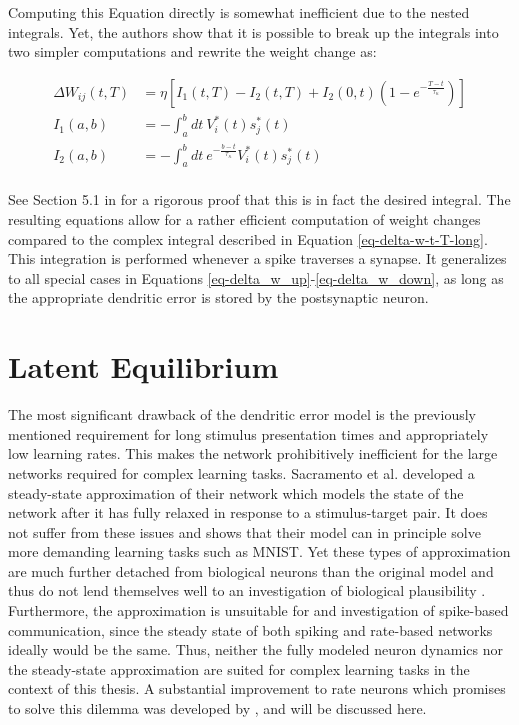 Computing this Equation directly is somewhat inefficient due to the nested integrals. Yet, the authors show that it is
possible to break up the integrals into two simpler computations and rewrite the weight change as:


\begin{align}
  \Delta W_{ij}(t, T) & = \eta \left[ I_1 (t, T) - I_2(t,T) + I_2(0,t)\left( 1- e^{-\frac{T-t}{\tau_\kappa}} \right) \right]\label{eq-proof-start} \\
  I_1(a, b)           & = -\int_{a}^{b} dt \ V_i^\ast (t) s_j^\ast (t)                                                                             \\
  I_2(a, b)           & = -\int_{a}^{b} dt \ e^{-\frac{b-t}{\tau_\kappa}} V_i^\ast (t) s_j^\ast (t)\label{eq-proof-end}                            \\
\end{align}

See Section 5.1 in \citep{Stapmanns2021} for a rigorous proof that this is in fact the desired integral. The resulting
equations allow for a rather efficient computation of weight changes compared to the complex integral described in
Equation \ref{eq-delta-w-t-T-long}. This integration is performed whenever a spike traverses a synapse. It generalizes
to all special cases in Equations \ref{eq-delta_w_up}-\ref{eq-delta_w_down}, as long as the appropriate dendritic error
is stored by the postsynaptic neuron.

\section{Latent Equilibrium}\label{sec-latent-eq}

The most significant drawback of the dendritic error model is the previously mentioned requirement for long stimulus
presentation times and appropriately low learning rates. This makes the network prohibitively inefficient for the large
networks required for complex learning tasks. Sacramento et al. developed a steady-state approximation of their network
which models the state of the network after it has fully relaxed in response to a stimulus-target pair. It does not
suffer from these issues and shows that their model can in principle solve more demanding learning tasks such as MNIST.
Yet these types of approximation are much further detached from biological neurons than the original model and thus do
not lend themselves well to an investigation of biological plausibility \citep{Gerstner2009}. Furthermore, the
approximation is unsuitable for and investigation of spike-based communication, since the steady state of both spiking
and rate-based networks ideally would be the same. Thus, neither the fully modeled neuron dynamics nor the steady-state
approximation are suited for complex learning tasks in the context of this thesis. A substantial improvement to rate
neurons which promises to solve this dilemma was developed by \citep{Haider2021}, and will be discussed here.
\newline

